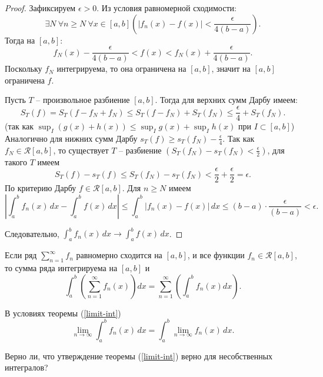 \begin{proof}
    Зафиксируем $\epsilon > 0$. Из условия равномерной сходимости:
    \[\exists N \ \forall n \geq N \ \forall x \in [a, b] \left(|f_{n}(x) - f(x)| < \frac{\epsilon}{4(b - a)}\right).\]
    Тогда на $[a, b]$:
    \[f_{N}(x) - \frac{\epsilon}{4(b - a)} < f(x) < f_{N}(x) + \frac{\epsilon}{4(b - a)}.\]
    Поскольку $f_{N}$ интегрируема, то она ограничена на $[a, b]$, значит на $[a, b]$ ограничена $f$.

    Пусть $T$ -- произвольное разбиение $[a, b]$. Тогда для верхних сумм Дарбу имеем:
    \[S_{T}(f) = S_{T}(f - f_{N} + f_{N}) \leq S_{T}(f - f_{N}) + S_{T}(f_{N}) \leq \frac{\epsilon}{4} + S_{T}(f_{N}).\]
    (так как $\sup_I \left(g(x) + h(x)\right) \le \sup_I g(x) + \sup_I h(x)$ при $I \subset [a, b]$)\\
    Аналогично для нижних сумм Дарбу $s_{T}(f) \geq s_{T}(f_{N}) - \frac{\epsilon}{4}$.
    Так как $f_{N} \in \mathcal{R}[a, b]$, то существует $T$ -- разбиение $\left(S_T(f_N) - s_T(f_N) < \frac{\epsilon}{2}\right)$, для такого $T$ имеем 
    \[S_T(f) - s_T(f) \le S_T(f_N) - s_T(f_N) < \frac{\epsilon}{2} + \frac{\epsilon}{2} = \epsilon.\]
    По критерию Дарбу $f \in \mathcal{R}[a, b]$.
    Для $n \ge N$ имеем
    \[
        \left|\int_a^b f_n(x)\, dx - \int_a^b f(x)\, dx\right| \le \int_a^b |f_n(x) - f(x)|\, dx \le (b - a) \cdot \frac{\epsilon}{(b - a)} < \epsilon.
    \]

    Следовательно, $\int_a^b f_n(x)\, dx \rightarrow \int_a^b f(x)\, dx$.
\end{proof}

\begin{corollary}
    Если ряд $\sum_{n = 1}^{\infty}f_{n}$ равномерно сходится на $[a, b]$, и все функции $f_{n} \in \mathcal{R}[a, b]$, то сумма ряда интегрируема на $[a, b]$ и 
    \[\int_{a}^{b}\left(\sum_{n = 1}^{\infty} f_{n}(x)\right)dx = \sum_{n = 1}^{\infty}\left(\int_{a}^{b} f_{n}(x)dx\right).\]
\end{corollary}

\begin{note}
    В условиях теоремы (\ref{limit-int})
    \[\lim_{n \rightarrow \infty} \int_a^b f_n(x)\, dx = \int_a^b \lim_{n \rightarrow \infty} f_n(x)\, dx.\]
\end{note}

\begin{problem}
    Верно ли, что утверждение теоремы (\ref{limit-int}) верно для несобственных интегралов?
\end{problem}

